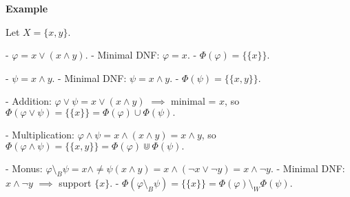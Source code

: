 \textbf{Example}

Let \(X=\{x,y\}\).

- \(\varphi = x \vee (x\wedge y)\).  
  - Minimal DNF: \(\varphi = x\).  
  - \(\Phi(\varphi) = \{\{x\}\}.\)

- \(\psi = x \wedge y\).  
  - Minimal DNF: \(\psi = x\wedge y\).  
  - \(\Phi(\psi) = \{\{x,y\}\}.\)

- Addition:  
  \(\varphi \vee \psi = x \vee (x\wedge y)\) $\implies$ minimal = \(x\), so  
  \(\Phi(\varphi\vee\psi) = \{\{x\}\} = \Phi(\varphi)\cup\Phi(\psi).\)

- Multiplication:  
  \(\varphi \wedge \psi = x\wedge(x\wedge y) = x\wedge y\), so  
  \(\Phi(\varphi\wedge\psi) = \{\{x,y\}\} = \Phi(\varphi)\Cup\Phi(\psi).\)

- Monus:  
  \(\varphi\setminus_B\psi = x\wedge\ne\psi(x\wedge y) = x\wedge(\neg x\vee\neg y) = x\wedge\neg y\).  
  - Minimal DNF: \(x\wedge\neg y\) $\implies$ support \(\{x\}\).  
  - \(\Phi(\varphi\setminus_B\psi) = \{\{x\}\} = \Phi(\varphi)\setminus_W\Phi(\psi).\)